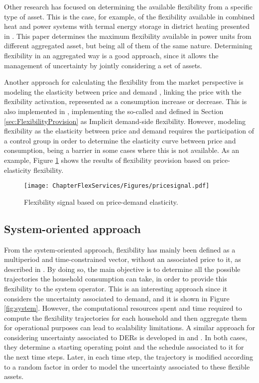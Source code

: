 
Other research has focused on determining the available flexibility from a specific type of asset. This is the case, for example, of the flexibility available in combined heat and power systems with termal energy storage in district heating presented in \cite{nuytten2013flexibility}. This paper determines the maximum flexibility available in power units from different aggregated asset, but being all of them of the same nature. Determining flexibility in an aggregated way is a good approach, since it allows the management of uncertainty by jointly considering a set of assets.  

Another approach for calculating the flexibility from the market perspective is modeling the elasticity between price and demand \cite{Gorria2013}, linking the price with the flexibility activation, represented as a consumption increase or decrease. This is also implemented in \cite{Moret2016}, implementing the so-called and defined in Section \ref{sec:FlexibilityProvision} as Implicit demand-side flexibility. However, modeling flexibility as the elasticity between price and demand requires the participation of a control group in order to determine the elasticity curve between price and consumption, being a barrier in some cases where this is not available. As an example, Figure \ref{fig:elasticity} shows the results of flexibility provision based on price-elasticity flexibility. 

\begin{figure}[htbp]
	\centering
	\texttt{[image: ChapterFlexServices/Figures/pricesignal.pdf]}
		\caption{Flexibility signal based on price-demand elasticity.}
	\label{fig:elasticity}  
\end{figure}


\subsection{System-oriented approach}
From the system-oriented approach, flexibility has mainly been defined as a multiperiod and time-constrained vector, without an associated price to it, as described in \cite{Pinto2017}. By doing so, the main objective is to determine all the possible trajectories the household consumption can take, in order to provide this flexibility to the system operator. This is an interesting approach since it considers the uncertainty associated to demand, and it is shown in Figure \ref{fig:system}. However, the computational resources spent and time required to compute the flexibility trajectories for each household and then aggregate them for operational purposes can lead to scalability limitations. A similar approach for considering uncertainty associated to DERs is developed in \cite{Bremer2013} and \cite{SONNENSCHEIN2015}. In both cases, they determine a starting operating point and the schedule associated to it for the next time steps. Later, in each time step, the trajectory is modified according to a random factor in order to model the uncertainty associated to these flexible assets. 

